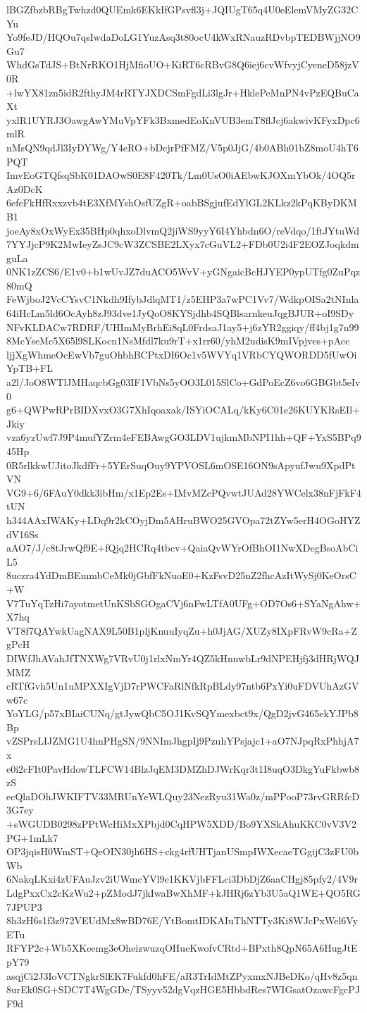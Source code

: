 lBGZfbzbRBgTwhzd0QUEmk6EKkIfGPsvfl3j+JQIUgT65q4U0eElemVMyZG32CYu
Yo9feJD/HQOu7qsIwdaDoLG1YuzAsq3t80ocU4kWxRNauzRDvbpTEDBWjjNO9Gu7
WhdGsTdJS+BtNrRKO1HjMfioUO+KiRT6cRBvG8Q6iej6cvWfvyjCyeneD58jzV0R
+lwYX81zn5idR2fthyJM4rRTYJXDCSmFgdLi3lgJr+HklePeMnPN4vPzEQBuCaXt
yxlR1UYRJ3OawgAwYMuVpYFk3BxmedEoKnVUB3emT8flJcj6akwivKFyxDpc6mlR
nMsQN9qdJl3IyDYWg/Y4eRO+bDcjrPfFMZ/V5p0JjG/4b0ABh01bZ8moU4hT6PQT
ImvEoGTQfsqSbK01DAOwS0E8F420Tk/Lm0UsO0iAEbwKJOXmYbOk/4OQ5rAz0DcK
6efeFkHfRxxzvb4tE3XfMYshOsfUZgR+oabBSgjufEdYlGL2KLkz2kPqKByDKMB1
joeAy8xOxWyEx35BHp0qhxoDlvmQ2jiWS9yyY6I4Yhbdn6O/reVdqo/1ftJYtuWd
7YYJjcP9K2MwIeyZsJC9cW3ZCSBE2LXyx7cGuVL2+FDb0U2i4F2EOZJoqkdmguLa
0NK1zZCS6/E1v0+b1wUvJZ7duACO5WvV+yGNgaicBcHJYEP0ypUTfg0ZuPqz80mQ
FeWjboJ2VcCYsvC1Nkdh9IfybJdlqMT1/z5EHP3a7wPC1Vv7/WdkpOISa2tNInla
64iHcLm5ld6OcAyh8zJ93dve1JyQoO8KYSjdhb4SQBlsarnkeuJqgBJUR+oI9SDy
NFvKLDACw7RDRF/UHImMyBrhEi8qL0FrdsaJ1ay5+j6zYR2ggiqy/ff4bj1g7n99
8McYseMc5X65l9SLKocn1NsMfdl7ku9rT+x1rr60/yhM2udisK9mIVpjves+pAcc
ljjXgWhmeOcEwVb7guOhbhBCPtxDI6Oc1v5WVYq1VRbCYQWORDD5fUwOiYpTB+FL
a2l/JoO8WTlJMHaqcbGg03IF1VbNs5yOO3L015SlCo+GdPoEcZ6vo6GBGbt5eIv0
g6+QWPwRPrBIDXvxO3G7XhIqoaxak/ISYiOCALq/kKy6C01e26KUYKRsEIl+Jkiy
vza6yzUwf7J9P4mufYZrm4eFEBAwgGO3LDV1ujkmMbNPI1hh+QF+YxS5BPq945Hp
0R5rlkkwUJitoJkdfFr+5YErSuqOuy9YPVOSL6mOSE16ON9sApyufJwu9XpdPtVN
VG9+6/6FAuY0dkk3ibHm/x1Ep2Es+IMvMZcPQvwtJUAd28YWCelx38nFjFkF4tUN
h344AAxIWAKy+LDq9r2kCOyjDm5AHruBWO25GVOpa72tZYw5erH4OGoHYZdV16Ss
aAO7/J/c8tJrwQf9E+fQjq2HCRq4tbcv+QaiaQvWYrOfBhOI1NwXDegBsoAbCiL5
8uczra4YdDmBEmmbCeMk0jGbfFkNuoE0+KzFsvD25nZ2fhcAzItWySj0KeOrsC+W
V7TuYqTzHi7ayotmetUnKSbSGOgaCVj6nFwLTfA0UFg+OD7Os6+SYaNgAhw+X7hq
VT8f7QAYwkUagNAX9L50B1pljKnuuIyqZu+h0JjAG/XUZy8IXpFRvW9cRa+ZgPcH
DIWfJhAVahJfTNXWg7VRvU0j1rlxNmYr4QZ5kHnnwbLr9dNPEHjfj3dHRjWQJMMZ
cRTfGvh5Un1uMPXXIgVjD7rPWCFaRlNfkRpBLdy97ntb6PxYi0uFDVUhAzGVw67c
YoYLG/p57xBIaiCUNq/gtJywQbC5OJ1KvSQYmexbct9x/QgD2jvG465ekYJPb8Bp
vZSPrsLIJZMG1U4hnPHgSN/9NNImJhgpIj9PzuhYPsjajc1+aO7NJpqRxPhhjA7x
e0i2cFIt0PavHdowTLFCW14BlzJqEM3DMZhDJWrKqr3t1I8uqO3DkgYuFkbwb8zS
ecQlaDOhJWKIFTV33MRUnYeWLQuy23NezRyu31Wa0z/mPPooP73rvGRRfcD3G7ey
+sWGUDB0298zPPtWcHiMxXPbjd0CqHPW5XDD/Bo9YXSkAhuKKC0vV3V2PG+1mLk7
OP3jqisH0WmST+QeOIN30jh6HS+ckg4rfUHTjanUSmpIWXecaeTGgijC3zFU0bWb
6NakqLKxi4zUFAuJzv2iUWmcYVl9e1KKVjbFFLci3DbDjZ6aaCHgj85pfy2/4V9r
LdgPxxCx2cKzWu2+pZModJ7jkIwaBwXhMF+kJHRj6zYb3U5aQ1WE+QO5RG7JPUP3
8h3zH6s1f3z972VEUdMx8wBD76E/YtBomtIDKAIuThNTTy3Ki8WJcPxWel6VyETu
RFYP2c+Wb5XKeemg3eOheizwuzqOHueKwofvCRtd+BPxth8QpN65A6HugJtEpY79
asqjCi2J3IoVCTNgkrSlEK7Fukfd0hFE/aR3TrIdMtZPyxmxNJBeDKo/qHv8z5qn
8urEk0SG+SDC7T4WgGDe/TSyyv52dgVqzHGE5HbbdRes7WIGsatOzawcFgcPJF9d
